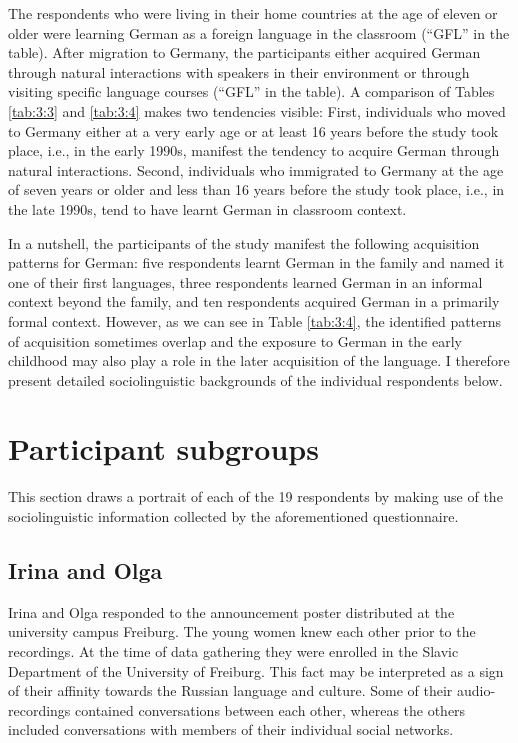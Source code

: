 The respondents who were living in their home countries at the age of eleven or older were learning German as a foreign language in the classroom (“GFL” in the table). After migration to Germany, the participants either acquired German through natural interactions with speakers in their environment or through visiting specific language courses (“GFL” in the table). A comparison of Tables \ref{tab:3:3} and \ref{tab:3:4} makes two tendencies visible: First, individuals who moved to Germany either at a very early age or at least 16 years before the study took place, i.e., in the early 1990s, manifest the tendency to acquire German through natural interactions. Second, individuals who immigrated to Germany at the age of seven years or older and less than 16 years before the study took place, i.e., in the late 1990s, tend to have learnt German in classroom context.

In a nutshell, the participants of the study manifest the following acquisition patterns for German: five respondents learnt German in the family and named it one of their first languages, three respondents learned German in an informal context beyond the family, and ten respondents acquired German in a primarily formal context. However, as we can see in Table \ref{tab:3:4}, the identified patterns of acquisition sometimes overlap and the exposure to German in the early childhood may also play a role in the later acquisition of the language. I therefore present detailed sociolinguistic backgrounds of the individual respondents below.

\section{Participant subgroups}\label{subgroups}

This section draws a portrait of each of the 19 respondents by making use of the sociolinguistic information collected by the aforementioned questionnaire.

\subsection{Irina and Olga}

Irina and Olga responded to the announcement poster distributed at the university campus Freiburg. The young women knew each other prior to the recordings. At the time of data gathering they were enrolled in the Slavic Department of the University of Freiburg. This fact may be interpreted as a sign of their affinity towards the Russian language and culture. Some of their audio-recordings contained conversations between each other, whereas the others included conversations with members of their individual social networks.

